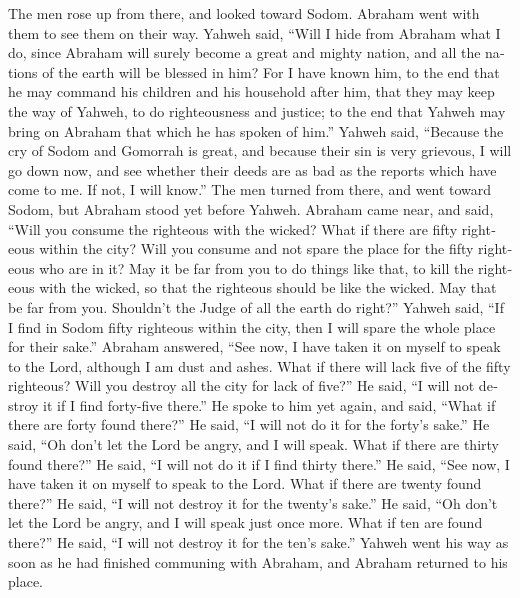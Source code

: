 \begin{paracol}{2}
\begin{otherlanguage}{english}
 The men rose up from there, and looked toward Sodom.
Abraham went with them to see them on their way.  Yahweh
said, ``Will I hide from Abraham what I do,  since
Abraham will surely become a great and mighty nation, and all the
nations of the earth will be blessed in him?  For I have
known him, to the end that he may command his children and his household
after him, that they may keep the way of Yahweh, to do righteousness and
justice; to the end that Yahweh may bring on Abraham that which he has
spoken of him.''  Yahweh said, ``Because the cry of Sodom
and Gomorrah is great, and because their sin is very grievous,
 I will go down now, and see whether their deeds are as
bad as the reports which have come to me. If not, I will know.''
 The men turned from there, and went toward Sodom, but
Abraham stood yet before Yahweh.  Abraham came near, and
said, ``Will you consume the righteous with the wicked? 
What if there are fifty righteous within the city? Will you consume and
not spare the place for the fifty righteous who are in it?
 May it be far from you to do things like that, to kill
the righteous with the wicked, so that the righteous should be like the
wicked. May that be far from you. Shouldn't the Judge of all the earth
do right?''  Yahweh said, ``If I find in Sodom fifty
righteous within the city, then I will spare the whole place for their
sake.''  Abraham answered, ``See now, I have taken it on
myself to speak to the Lord, although I am dust and ashes.
 What if there will lack five of the fifty righteous?
Will you destroy all the city for lack of five?'' He said, ``I will not
destroy it if I find forty-five there.''  He spoke to him
yet again, and said, ``What if there are forty found there?'' He said,
``I will not do it for the forty's sake.''  He said, ``Oh
don't let the Lord be angry, and I will speak. What if there are thirty
found there?'' He said, ``I will not do it if I find thirty there.''
 He said, ``See now, I have taken it on myself to speak
to the Lord. What if there are twenty found there?'' He said, ``I will
not destroy it for the twenty's sake.''  He said, ``Oh
don't let the Lord be angry, and I will speak just once more. What if
ten are found there?'' He said, ``I will not destroy it for the ten's
sake.''  Yahweh went his way as soon as he had finished
communing with Abraham, and Abraham returned to his place.


\end{otherlanguage}
\end{paracol}
